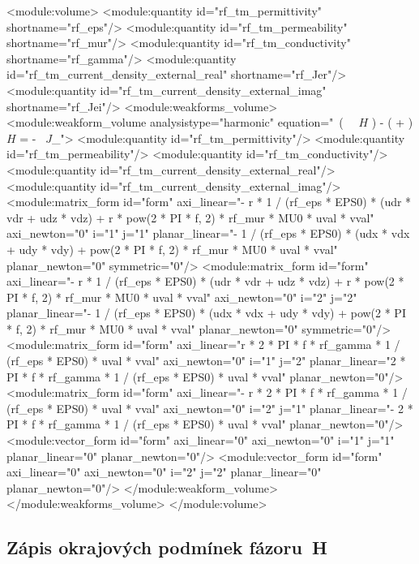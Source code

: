 \documentclass[12pt,a4paper,oneside]{article}
\numberwithin{equation}{section} %
\numberwithin{figure}{section} %
\numberwithin{table}{section} %
\newcommand{\mj}{\mathrm{j}} %
\newcommand{\vecfaz}[1]{\mbox{\underline{\boldmath$#1$}}} %
\newcommand{\curl}{\mathrm{curl}\ }
\begin{document}
\begin{spverbatim}
<module:volume>
    <module:quantity id="rf_tm_permittivity" shortname="rf_eps"/>
    <module:quantity id="rf_tm_permeability" shortname="rf_mur"/>
    <module:quantity id="rf_tm_conductivity" shortname="rf_gamma"/>
    <module:quantity id="rf_tm_current_density_external_real" shortname="rf_Jer"/>
    <module:quantity id="rf_tm_current_density_external_imag" shortname="rf_Jei"/>
    <module:weakforms_volume>
      <module:weakform_volume analysistype="harmonic" equation="\curl \left( \, \curl \vecfaz{H} \right) - \mj \omega \left( \sigma + \mj \omega \varepsilon \right) \vecfaz{H} = - \curl \vecfaz{J}_{}">
        <module:quantity id="rf_tm_permittivity"/>
        <module:quantity id="rf_tm_permeability"/>
        <module:quantity id="rf_tm_conductivity"/>
        <module:quantity id="rf_tm_current_density_external_real"/>
        <module:quantity id="rf_tm_current_density_external_imag"/>
        <module:matrix_form id="form" axi_linear="- r * 1 / (rf_eps * EPS0) * (udr * vdr + udz * vdz) + r * pow(2 * PI * f, 2) * rf_mur * MU0 * uval * vval" axi_newton="0" i="1" j="1" planar_linear="- 1 / (rf_eps * EPS0) * (udx * vdx + udy * vdy) + pow(2 * PI * f, 2) * rf_mur * MU0 * uval * vval" planar_newton="0" symmetric="0"/>
        <module:matrix_form id="form" axi_linear="- r * 1 / (rf_eps * EPS0) * (udr * vdr + udz * vdz) + r * pow(2 * PI * f, 2) * rf_mur * MU0 * uval * vval" axi_newton="0" i="2" j="2" planar_linear="- 1 / (rf_eps * EPS0) * (udx * vdx + udy * vdy) + pow(2 * PI * f, 2) * rf_mur * MU0 * uval * vval" planar_newton="0" symmetric="0"/>
        <module:matrix_form id="form" axi_linear="r * 2 * PI * f * rf_gamma * 1 / (rf_eps * EPS0) * uval * vval" axi_newton="0" i="1" j="2" planar_linear="2 * PI * f * rf_gamma * 1 / (rf_eps * EPS0) * uval * vval" planar_newton="0"/>
        <module:matrix_form id="form" axi_linear="- r * 2 * PI * f * rf_gamma * 1 / (rf_eps * EPS0) * uval * vval" axi_newton="0" i="2" j="1" planar_linear="- 2 * PI * f * rf_gamma * 1 / (rf_eps * EPS0) * uval * vval" planar_newton="0"/>
        <module:vector_form id="form" axi_linear="0" axi_newton="0" i="1" j="1" planar_linear="0" planar_newton="0"/>
        <module:vector_form id="form" axi_linear="0" axi_newton="0" i="2" j="2" planar_linear="0" planar_newton="0"/>
     </module:weakform_volume>
    </module:weakforms_volume>
  </module:volume>
\end{spverbatim}


\subsection*{Zápis okrajových podmínek fázoru~H}
\label{xmlHs}
\end{document}

